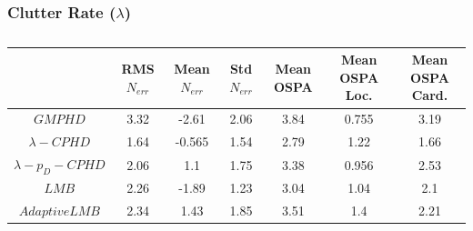 \documentclass{article}
\begin{document}
\subsubsection*{Clutter Rate ($\lambda$)}
\begin{table}[H]
  \centering
  \begin{tabular}{ c| c | c | c | c | c | c }
    & RMS $N_{err}$ & Mean $N_{err}$ & Std $N_{err}$ & Mean OSPA & Mean OSPA Loc. & Mean OSPA Card.\\
    \hline
    $GMPHD$ & 3.32 & -2.61 & 2.06 & 3.84 & 0.755 & 3.19 \\
    $\lambda-CPHD$ & 1.64 & -0.565 & 1.54 & 2.79 & 1.22 & 1.66 \\
    $\lambda-p_D-CPHD$ & 2.06 & 1.1 & 1.75 & 3.38 & 0.956 & 2.53 \\
    $LMB$ & 2.26 & -1.89 & 1.23 & 3.04 & 1.04 & 2.1 \\
  $Adaptive LMB$ & 2.34 & 1.43 & 1.85 & 3.51 & 1.4 & 2.21 \\
\end{tabular}  
  \caption{}
  \label{tab:}
\end{table}
\end{document}
